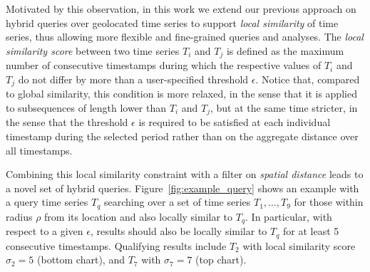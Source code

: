 Motivated by this observation, in this work we extend our previous approach on hybrid queries over geolocated time series to support {\em local similarity} of time series, thus allowing more flexible and fine-grained queries and analyses.
The {\em local similarity score} between two time series $T_i$ and $T_j$ is defined as the maximum number of consecutive timestamps during which the respective values of $T_i$ and $T_j$ do not differ by more than a user-specified threshold $\epsilon$.
Notice that, compared to global similarity, this condition is more relaxed, in the sense that it is applied to subsequences of length lower than $T_i$ and $T_j$, but at the same time stricter, in the sense that the threshold $\epsilon$ is required to be satisfied at each individual timestamp during the selected period rather than on the aggregate distance over all timestamps.

Combining this local similarity constraint with a filter on {\em spatial distance} leads to a novel set of hybrid queries. Figure~\ref{fig:example_query} shows an example with a query time series $T_q$ searching over a set of time series $T_1,\dots,T_9$ for those within radius $\rho$ from its location and also locally similar to $T_q$. In particular, with respect to a given $\epsilon$, results should also be locally similar to $T_q$ for at least 5 consecutive timestamps. Qualifying results include $T_2$ with local similarity score $\sigma_2 = 5$ (bottom chart), and $T_7$ with $\sigma_7 = 7$ (top chart).

